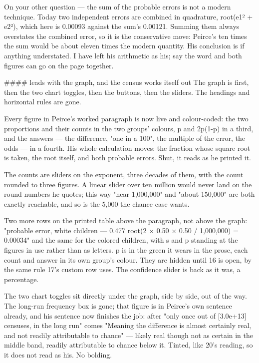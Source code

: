 On your other question — the sum of the probable errors is not a modern
technique. Today two independent errors are combined in quadrature,
root(e1² + e2²), which here is 0.00093 against the sum's 0.00121. Summing them
always overstates the combined error, so it is the conservative move: Peirce's
ten times the sum would be about eleven times the modern quantity. His
conclusion is if anything understated. I have left his arithmetic as his; say
the word and both figures can go on the page together.

#### leads with the graph, and the census works itself out
The graph is first, then the two chart toggles, then the buttons, then the
sliders. The headings and horizontal rules are gone.

Every figure in Peirce's worked paragraph is now live and colour-coded: the two
proportions and their counts in the two groups' colours, p and 2p(1-p) in a
third, and the answers — the difference, "one in a 100", the multiple of the
error, the odds — in a fourth. His whole calculation moves: the fraction whose
square root is taken, the root itself, and both probable errors. Shut, it reads
as he printed it.

The counts are sliders on the exponent, three decades of them, with the count
rounded to three figures. A linear slider over ten million would never land on
the round numbers he quotes; this way "near 1,000,000" and "about 150,000" are
both exactly reachable, and so is the 5,000 the chance case wants.

Two more rows on the printed table above the paragraph, not above the graph:
"probable error, white children — 0.477 root(2 × 0.50 × 0.50 / 1,000,000) =
0.00034" and the same for the colored children, with s and p standing at the
figures in use rather than as letters. p is in the green it wears in the prose,
each count and answer in its own group's colour. They are hidden until 16 is
open, by the same rule 17's custom row uses. The confidence slider is back as it
was, a percentage.

The two chart toggles sit directly under the graph, side by side, out of the
way. The long-run frequency box is gone; that figure is in Peirce's own sentence
already, and his sentence now finishes the job: after "only once out of
[3.0e+13] censuses, in the long run" comes "Meaning the difference is almost
certainly real, and not readily attributable to chance" — likely real though not
as certain in the middle band, readily attributable to chance below it. Tinted,
like 20's reading, so it does not read as his. No bolding.

